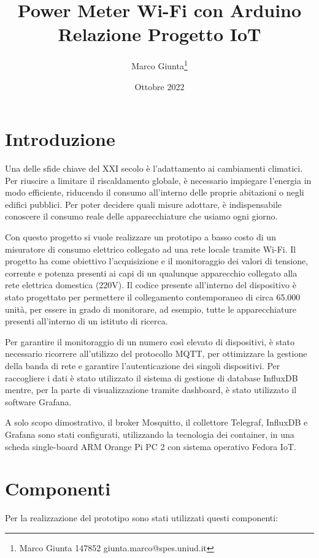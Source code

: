 \documentclass[italian,12pt,a4paper,oneside,final]{report}
\title{\huge Power Meter Wi-Fi con Arduino\\[0.5em]
\large Relazione Progetto IoT}
\date{Ottobre 2022}
\author{
Marco Giunta\thanks{Marco Giunta 147852 giunta.marco@spes.uniud.it}}
\begin{document}
\maketitle

\tableofcontents

\newpage

\section{Introduzione}
Una delle sfide chiave del XXI secolo è l’adattamento ai cambiamenti climatici.
Per riuscire a limitare il riscaldamento globale, è necessario impiegare l’energia in modo efficiente, riducendo il consumo all'interno delle proprie abitazioni o negli edifici pubblici.
Per poter decidere quali misure adottare, è indispensabile conoscere il consumo reale delle apparecchiature che usiamo ogni giorno.

Con questo progetto si vuole realizzare un prototipo a basso costo di un misuratore di consumo elettrico collegato ad una rete locale tramite Wi-Fi.
Il progetto ha come obiettivo l’acquisizione e il monitoraggio dei valori di tensione, corrente e potenza presenti ai capi di un qualunque apparecchio collegato alla rete elettrica domestica (220V).
Il codice presente all'interno del dispositivo è stato progettato per permettere il collegamento contemporaneo di circa 65.000 unità, per essere in grado di monitorare, ad esempio, tutte le apparecchiature presenti all'interno di un istituto di ricerca.

Per garantire il monitoraggio di un numero così elevato di dispositivi, è stato necessario ricorrere all'utilizzo del protocollo MQTT, per ottimizzare la gestione della banda di rete e garantire l'autenticazione dei singoli dispositivi.
Per raccogliere i dati è stato utilizzato il sistema di gestione di database InfluxDB mentre, per la parte di visualizzazione tramite dashboard, è stato utilizzato il software Grafana.

A solo scopo dimostrativo, il broker Mosquitto, il collettore Telegraf, InfluxDB e Grafana sono stati configurati, utilizzando la tecnologia dei container, in una scheda single-board ARM Orange Pi PC 2 con sistema operativo Fedora IoT.

\newpage

\section{Componenti}
Per la realizzazione del prototipo sono stati utilizzati questi componenti:
\end{document}
